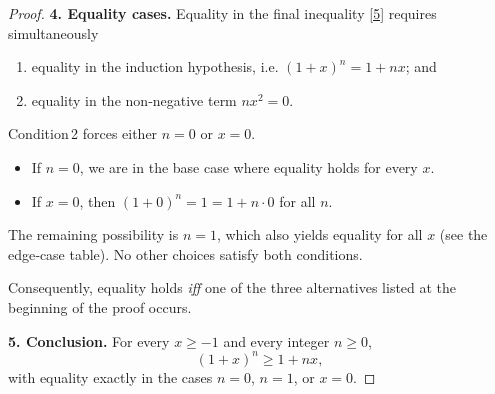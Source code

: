 \begin{proof}
\medskip

\textbf{4. Equality cases.}  Equality in the final inequality \eqref{5} requires simultaneously  

\begin{enumerate}
\item equality in the induction hypothesis, i.e. $(1+x)^{n}=1+nx$; and
\item equality in the non‑negative term $nx^{2}=0$.
\end{enumerate}
Condition 2 forces either $n=0$ or $x=0$.  

\begin{itemize}
\item If $n=0$, we are in the base case where equality holds for every $x$.
\item If $x=0$, then $(1+0)^{n}=1=1+n\cdot0$ for all $n$.
\end{itemize}
The remaining possibility is $n=1$, which also yields equality for all $x$ (see the edge‑case table).  No other choices satisfy both conditions.

Consequently, equality holds \emph{iff} one of the three alternatives listed at the beginning of the proof occurs.

\medskip

\textbf{5. Conclusion.}  For every $x\ge-1$ and every integer $n\ge0$,
\[
\boxed{(1+x)^{n}\ge 1+nx},
\]
with equality exactly in the cases $n=0$, $n=1$, or $x=0$.
\end{proof}